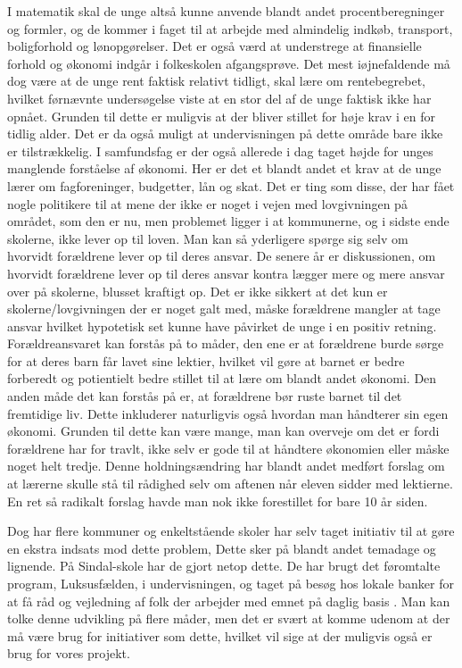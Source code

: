 I matematik skal de unge altså kunne anvende blandt andet procentberegninger og formler, og de kommer i faget til at arbejde med almindelig indkøb, transport, boligforhold og lønopgørelser. Det er også værd at understrege at finansielle forhold og økonomi indgår i folkeskolen afgangsprøve. Det mest iøjnefaldende må dog være at de unge rent faktisk relativt tidligt, skal lære om rentebegrebet, hvilket førnævnte undersøgelse viste at en stor del af de unge faktisk ikke har opnået. Grunden til dette er muligvis at der bliver stillet for høje krav i en for tidlig alder. Det er da også muligt at undervisningen på dette område bare ikke er tilstrækkelig.
I samfundsfag er der også allerede i dag taget højde for unges manglende forståelse af økonomi. Her er det et blandt andet et krav at de unge lærer om fagforeninger, budgetter, lån og skat. Det er ting som disse, der har fået nogle politikere til at mene der ikke er noget i vejen med lovgivningen på området, som den er nu, men problemet ligger i at kommunerne, og i sidste ende skolerne, ikke lever op til loven\cite{BusinessDK3}. Man kan så yderligere spørge sig selv om hvorvidt forældrene lever op til deres ansvar. De senere år er diskussionen, om hvorvidt forældrene lever op til deres ansvar kontra lægger mere og mere ansvar over på skolerne, blusset kraftigt op. Det er ikke sikkert at det kun er skolerne/lovgivningen der er noget galt med, måske forældrene mangler at tage ansvar hvilket hypotetisk set kunne have påvirket de unge i en positiv retning. Forældreansvaret kan forstås på to måder, den ene er at forældrene burde sørge for at deres barn får lavet sine lektier, hvilket vil gøre at barnet er bedre forberedt og potientielt bedre stillet til at lære om blandt andet økonomi. Den anden måde det kan forstås på er, at forældrene bør ruste barnet til det fremtidige liv. Dette inkluderer naturligvis også hvordan man håndterer sin egen økonomi. Grunden til dette kan være mange, man kan overveje om det er fordi forældrene har for travlt, ikke selv er gode til at håndtere økonomien eller måske noget helt tredje. Denne holdningsændring har blandt andet medført forslag om at lærerne skulle stå til rådighed selv om aftenen når eleven sidder med lektierne. En ret så radikalt forslag havde man nok ikke forestillet for bare 10 år siden\cite{ForaldreAnsvar}.

Dog har flere kommuner og enkeltstående skoler har selv taget initiativ til at gøre en ekstra indsats mod dette problem, Dette sker på blandt andet temadage og lignende. På Sindal-skole har de gjort netop dette. De har brugt det føromtalte program, Luksusfælden, i undervisningen, og taget på besøg hos lokale banker for at få råd og vejledning af folk der arbejder med emnet på daglig basis \cite{Sindal}. Man kan tolke denne udvikling på flere måder, men det er svært at komme udenom at der må være brug for initiativer som dette, hvilket vil sige at der muligvis også er brug for vores projekt.






 